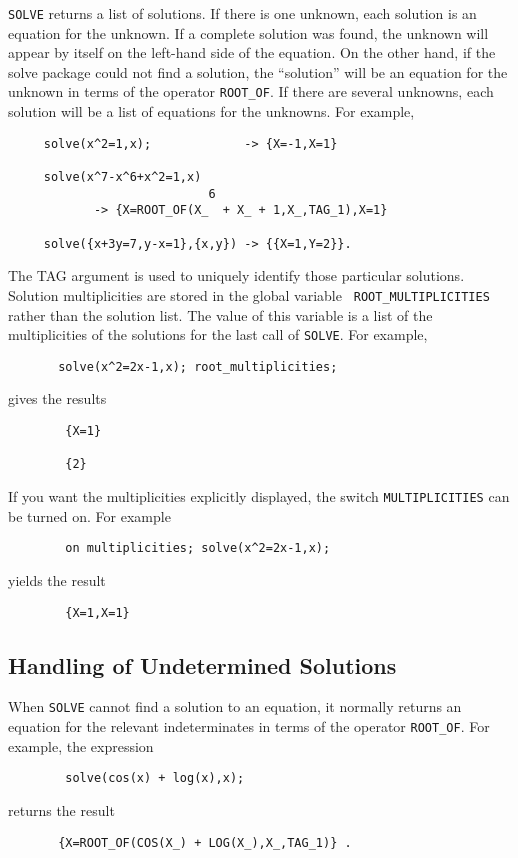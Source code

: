 {\tt SOLVE} returns a list of solutions.  If there is one unknown, each
solution is an equation for the unknown.  If a complete solution was
found, the unknown will appear by itself on the left-hand side of the
equation.  On the other hand, if the solve package could not find a
solution, the ``solution'' will be an equation for the unknown in terms
of the operator {\tt ROOT\_OF}. If there
are several unknowns, each solution will be a list of equations for the
unknowns.  For example,
\begin{verbatim}
     solve(x^2=1,x);             -> {X=-1,X=1}

     solve(x^7-x^6+x^2=1,x)
                            6
            -> {X=ROOT_OF(X_  + X_ + 1,X_,TAG_1),X=1}

     solve({x+3y=7,y-x=1},{x,y}) -> {{X=1,Y=2}}.
\end{verbatim}
The TAG argument is used to uniquely identify those particular solutions.
Solution multiplicities are stored in the global variable {\tt
ROOT\_MULTIPLICITIES} rather than the solution list.  The value of this
variable is a list of the multiplicities of the solutions for the last
call of {\tt SOLVE}.  For example,
\begin{verbatim}
       solve(x^2=2x-1,x); root_multiplicities;
\end{verbatim}
gives the results
\begin{verbatim}
        {X=1}

        {2}
\end{verbatim}

If you want the multiplicities explicitly displayed, the switch
{\tt MULTIPLICITIES} can be turned on. For example
\begin{verbatim}
        on multiplicities; solve(x^2=2x-1,x);
\end{verbatim}
yields the result
\begin{verbatim}
        {X=1,X=1}
\end{verbatim}

\subsection{Handling of Undetermined Solutions}
When {\tt SOLVE} cannot find a solution to an equation, it normally
returns an equation for the relevant indeterminates in terms of the
operator {\tt ROOT\_OF}.  For example, the expression
\begin{verbatim}
        solve(cos(x) + log(x),x);
\end{verbatim}
returns the result
\begin{verbatim}
       {X=ROOT_OF(COS(X_) + LOG(X_),X_,TAG_1)} .
\end{verbatim}

